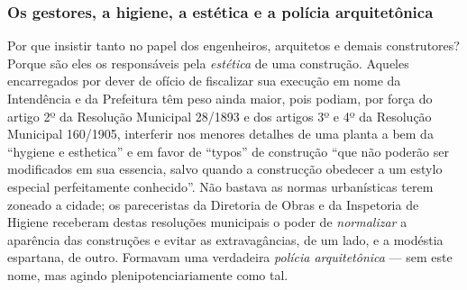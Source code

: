 \subsubsection{Os gestores, a higiene, a estética e a polícia arquitetônica}

Por que insistir tanto no papel dos engenheiros, arquitetos e demais construtores? Porque são eles os responsáveis pela \textit{estética} de uma construção. Aqueles encarregados por dever de ofício de fiscalizar sua execução em nome da Intendência e da Prefeitura têm peso ainda maior, pois podiam, por força do artigo 2º da Resolução Municipal 28/1893 e dos artigos 3º e 4º da Resolução Municipal 160/1905, interferir nos menores detalhes de uma planta a bem da ``hygiene e esthetica'' e em favor de ``typos'' de construção ``que não poderão ser modificados em sua essencia, salvo quando a construcção obedecer a um estylo especial perfeitamente conhecido''. Não bastava as normas urbanísticas terem zoneado a cidade; os pareceristas da Diretoria de Obras e da Inspetoria de Higiene receberam destas resoluções municipais o poder de \textit{normalizar} a aparência das construções e evitar as extravagâncias, de um lado, e a modéstia espartana, de outro. Formavam uma verdadeira \textit{polícia arquitetônica} --- sem este nome, mas agindo plenipotenciariamente como tal. 

